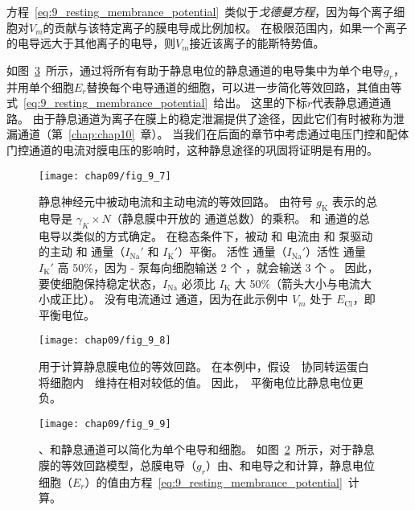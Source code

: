 \begin{proposition}[利用等效回路模型计算静息膜电位]
	\quad \quad 方程~\ref{eq:9_resting_membrance_potential}~类似于\textit{戈德曼方程}，因为每个离子细胞对$V_m$的贡献与该特定离子的膜电导成比例加权。
	在极限范围内，如果一个离子的电导远大于其他离子的电导，则$V_m$接近该离子的能斯特势值。
	
	\quad \quad 如图~\ref{fig:9_9}~所示，通过将所有有助于静息电位的静息通道的电导集中为单个电导$ g_r $，并用单个细胞$ E_r $替换每个电导通道的细胞，可以进一步简化等效回路，其值由等式~\ref{eq:9_resting_membrance_potential}~给出。
	这里的下标$ r $代表静息通道通路。
	由于静息通道为离子在膜上的稳定泄漏提供了途径，因此它们有时被称为泄漏通道（第~\ref{chap:chap10}~章）。
	当我们在后面的章节中考虑通过电压门控和配体门控通道的电流对膜电压的影响时，这种静息途径的巩固将证明是有用的。
	
\end{proposition}


\begin{figure}[htbp]
	\centering
	\texttt{[image: chap09/fig\_9\_7]}
	\caption{静息神经元中被动电流和主动电流的等效回路。
		由符号 $ g_\text{K} $ 表示的总  电导是 $ \gamma_K \times N $（静息膜中开放的  通道总数）的乘积。
		 和  通道的总电导以类似的方式确定。
		在稳态条件下，被动  和  电流由 和 泵驱动的主动  和  通量（$I_\text{Na}'$ 和 $I_\text{K}'$）平衡。
		活性  通量（$I_\text{Na}'$）活性  通量 $I_\text{K}'$ 高 50\%，因为 - 泵每向细胞输送 2 个 ，就会输送 3 个 。
		因此，要使细胞保持稳定状态，$I_\text{Na}$ 必须比 $ I_\text{K} $ 大 50\%（箭头大小与电流大小成正比）。
		没有电流通过  通道，因为在此示例中 $ V_m $ 处于 $ E_\text{Cl} $，即  平衡电位。
	}
	\label{fig:9_7}
\end{figure}


\begin{figure}[htbp]
	\centering
	\texttt{[image: chap09/fig\_9\_8]}
	\caption{用于计算静息膜电位的等效回路。
		在本例中，假设~~协同转运蛋白将细胞内~~维持在相对较低的值。
		因此，~平衡电位比静息电位更负。}
	\label{fig:9_8}
\end{figure}


\begin{figure}[htbp]
	\centering
	\texttt{[image: chap09/fig\_9\_9]}
	\caption{、和静息通道可以简化为单个电导和细胞。
		如图~\ref{fig:9_8}~所示，对于静息膜的等效回路模型，总膜电导（$ g_r $）由、和电导之和计算，静息电位细胞（$ E_r $）的值由方程~\ref{eq:9_resting_membrance_potential}~计算。}
	\label{fig:9_9}
\end{figure}


